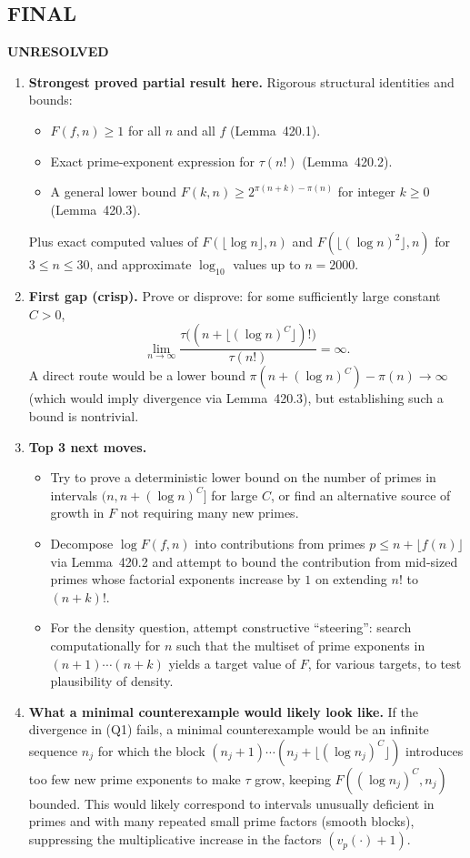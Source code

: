 \subsection*{FINAL}
\textbf{UNRESOLVED}
\begin{enumerate}
\item[(i)] \textbf{Strongest proved partial result here.}
Rigorous structural identities and bounds:
\begin{itemize}
\item $F(f,n)\ge 1$ for all $n$ and all $f$ (Lemma~420.1).
\item Exact prime-exponent expression for $\tau(n!)$ (Lemma~420.2).
\item A general lower bound $F(k,n)\ge 2^{\pi(n+k)-\pi(n)}$ for integer $k\ge 0$ (Lemma~420.3).
\end{itemize}
Plus exact computed values of $F(\lfloor\log n\rfloor,n)$ and $F(\lfloor(\log n)^2\rfloor,n)$ for $3\le n\le 30$, and approximate $\log_{10}$ values up to $n=2000$.
\item[(ii)] \textbf{First gap (crisp).}
Prove or disprove: for some sufficiently large constant $C>0$,
\[
\lim_{n\to\infty} \frac{\tau\big((n+\lfloor(\log n)^C\rfloor)!\big)}{\tau(n!)}=\infty.
\]
A direct route would be a lower bound $\pi(n+(\log n)^C)-\pi(n)\to\infty$ (which would imply divergence via Lemma~420.3), but establishing such a bound is nontrivial.
\item[(iii)] \textbf{Top 3 next moves.}
\begin{itemize}
\item Try to prove a deterministic lower bound on the number of primes in intervals $(n,n+(\log n)^C]$ for large $C$, or find an alternative source of growth in $F$ not requiring many new primes.
\item Decompose $\log F(f,n)$ into contributions from primes $p\le n+\lfloor f(n)\rfloor$ via Lemma~420.2 and attempt to bound the contribution from mid-sized primes whose factorial exponents increase by $1$ on extending $n!$ to $(n+k)!$.
\item For the density question, attempt constructive ``steering'': search computationally for $n$ such that the multiset of prime exponents in $(n+1)\cdots(n+k)$ yields a target value of $F$, for various targets, to test plausibility of density.
\end{itemize}
\item[(iv)] \textbf{What a minimal counterexample would likely look like.}
If the divergence in (Q1) fails, a minimal counterexample would be an infinite sequence $n_j$ for which the block $(n_j+1)\cdots(n_j+\lfloor(\log n_j)^C\rfloor)$ introduces too few new prime exponents to make $\tau$ grow, keeping $F((\log n_j)^C,n_j)$ bounded. This would likely correspond to intervals unusually deficient in primes and with many repeated small prime factors (smooth blocks), suppressing the multiplicative increase in the factors $(v_p(\cdot)+1)$.
\end{enumerate}

